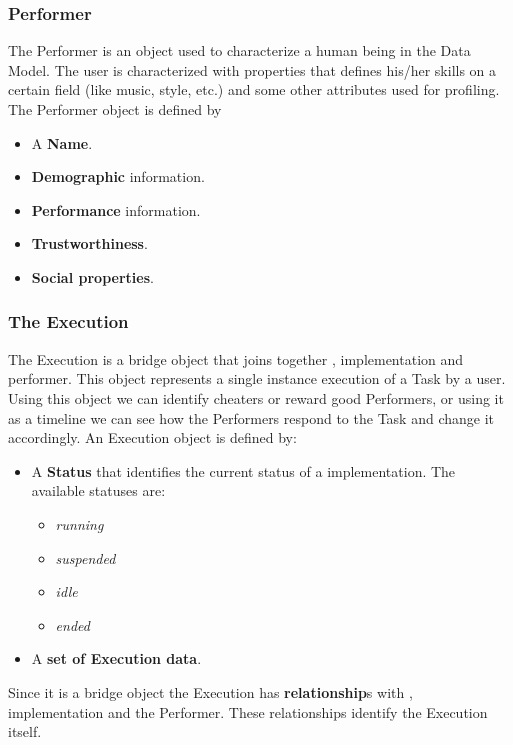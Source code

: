 \subsubsection{Performer}
The Performer is an object used to characterize a human being in the Data Model.
The user is characterized with properties that defines his/her skills on a
certain field (like music, style, etc.) and some other attributes used for
profiling. The Performer object is defined by
\begin{itemize}
    \item A \textbf{Name}.
    \item \textbf{Demographic} information.
    \item \textbf{Performance} information.
    \item \textbf{Trustworthiness}.
    \item \textbf{Social properties}.
\end{itemize}



\subsubsection{The Execution}
The Execution is a bridge object that joins together \utask{}, \utask{}
implementation and performer. This object represents a single instance execution
of a Task by a user. Using this object we can identify cheaters or reward good
Performers, or using it as a timeline we can see how the Performers respond to
the Task and change it accordingly. An Execution object is defined by:
\begin{itemize}
    \item A \textbf{Status} that identifies the current status of a \utask{}
    implementation. The available statuses are:
    \begin{itemize}
        \item \emph{running}
        \item \emph{suspended}
        \item \emph{idle}
        \item \emph{ended}
    \end{itemize}

    \item A \textbf{set of Execution data}.
\end{itemize}

Since it is a bridge object the Execution has \textbf{relationship}s with 
\utask{}, \utask{} implementation and the Performer. These relationships
identify the Execution itself.



